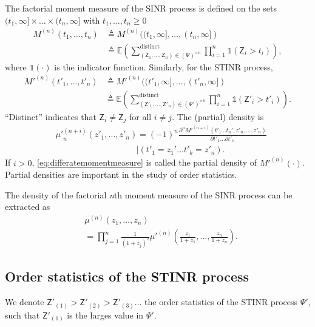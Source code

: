 \documentclass[lettersize,journal]{IEEEtran}
\begin{document}
The factorial moment measure of the SINR process is defined on the sets $(t_1,\infty] \times \dots \times (t_n, \infty]$ with $t_1,\dots,t_n\geq 0$
    \begin{align}
      M^{(n)}(t_1,\dots,t_n) &\triangleq M^{(n)}((t_1,\infty],\dots,(t_n,\infty]) \nonumber \\
          & \triangleq \mathbb{E} \left( \sum^{\text{distinct}}_{\left(\mathsf{Z}_1, \dots, \mathsf{Z}_n \right) \in (\Psi)^{\times n}} \prod_{i=1}^n \mathds{1}(\mathsf{Z}_i >t_i)\right),
    \end{align}
    where $\mathds{1}(\cdot)$ is the indicator function. Similarly, for the STINR process,
    \begin{align}
          M'^{(n)}(t'_1,\dots,t'_n) &\triangleq M'^{(n)}((t'_1,\infty],\dots,(t'_n,\infty]) \nonumber \\
              &\triangleq \mathbb{E} \left( \sum^{\text{distinct}}_{\left(\mathsf{Z}'_1, \dots, \mathsf{Z}'_n \right) \in (\Psi')^{\times n}} \prod_{i=1}^n \mathds{1}(\mathsf{Z}'_i >t'_i)\right).
    \end{align}
    ``Distinct'' indicates that $\mathsf{Z}_i \neq \mathsf{Z}_j $ for all $i \neq j $. The (partial) density is
    \begin{align}
      \label{eq:differatemomentmeasure}
     &{\mu'}_n^{(n+i)}(z'_1,\dots,z'_n)= (-1)^n \frac{\partial^n M'^{(n+i)}(t'_1\dots t_n', z'_n, \dots, z'_n)}{\partial t'_1 \dots \partial t'_n} \nonumber\\
      &\hspace{4cm}|(t'_1=z_1'\dots t'_k=z'_n).
    \end{align}
    If $i > 0$, \eqref{eq:differatemomentmeasure} is called the partial density of $M'^{(n)}(\cdot)$. Partial densities are important in the study of order statistics.

    The density of the factorial \textit{n}th moment measure of the SINR process can be extracted as
    \begin{align}
      \label{eq:SIRjointprobability}
      &\mu^{(n)}(z_1,\dots,z_n) \nonumber\\
      &= \prod_{j=1}^n\frac{1}{(1+z_j)^2}\mu'^{(n)}\left(\frac{z_1}{1+z_1},\dots,\frac{z_n}{1+z_n}\right).
    \end{align}

    
  
\subsection{Order statistics of the STINR process}
We denote $\mathsf{Z}'_{(1)}>\mathsf{Z}'_{(2)} >\mathsf{Z}'_{(3)} \dots$ the order statistics of the STINR process $\Psi'$, such that $\mathsf{Z}'_{(1)}$ is the larges value in $\Psi'$.
\end{document}
